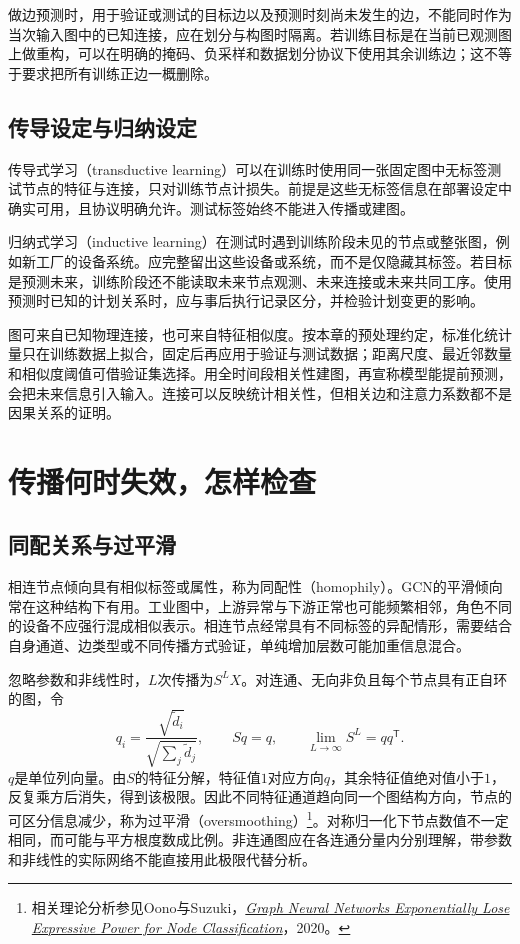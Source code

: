 做边预测时，用于验证或测试的目标边以及预测时刻尚未发生的边，不能同时作为当次输入图中的已知连接，应在划分与构图时隔离。若训练目标是在当前已观测图上做重构，可以在明确的掩码、负采样和数据划分协议下使用其余训练边；这不等于要求把所有训练正边一概删除。

\subsection{传导设定与归纳设定}
传导式学习（transductive learning）可以在训练时使用同一张固定图中无标签测试节点的特征与连接，只对训练节点计损失。前提是这些无标签信息在部署设定中确实可用，且协议明确允许。测试标签始终不能进入传播或建图。

归纳式学习（inductive learning）在测试时遇到训练阶段未见的节点或整张图，例如新工厂的设备系统。应完整留出这些设备或系统，而不是仅隐藏其标签。若目标是预测未来，训练阶段还不能读取未来节点观测、未来连接或未来共同工序。使用预测时已知的计划关系时，应与事后执行记录区分，并检验计划变更的影响。

图可来自已知物理连接，也可来自特征相似度。按本章的预处理约定，标准化统计量只在训练数据上拟合，固定后再应用于验证与测试数据；距离尺度、最近邻数量和相似度阈值可借验证集选择。用全时间段相关性建图，再宣称模型能提前预测，会把未来信息引入输入。连接可以反映统计相关性，但相关边和注意力系数都不是因果关系的证明。

\section{传播何时失效，怎样检查}
\subsection{同配关系与过平滑}
相连节点倾向具有相似标签或属性，称为同配性（homophily）。GCN的平滑倾向常在这种结构下有用。工业图中，上游异常与下游正常也可能频繁相邻，角色不同的设备不应强行混成相似表示。相连节点经常具有不同标签的异配情形，需要结合自身通道、边类型或不同传播方式验证，单纯增加层数可能加重信息混合。

忽略参数和非线性时，$L$次传播为$S^LX$。对连通、无向非负且每个节点具有正自环的图，令
\begin{equation}
 q_i=\frac{\sqrt{\widetilde d_i}}{\sqrt{\sum_j\widetilde d_j}},\qquad
 Sq=q,\qquad \lim_{L\to\infty}S^L=qq^{\mathsf T}.
 \label{eq:graph-oversmoothing-limit}
\end{equation}
$q$是单位列向量。由$S$的特征分解，特征值$1$对应方向$q$，其余特征值绝对值小于$1$，反复乘方后消失，得到该极限。因此不同特征通道趋向同一个图结构方向，节点的可区分信息减少，称为过平滑（oversmoothing）\footnote{相关理论分析参见Oono与Suzuki，\href{https://arxiv.org/abs/1905.10947}{\textit{Graph Neural Networks Exponentially Lose Expressive Power for Node Classification}}，2020。}。对称归一化下节点数值不一定相同，而可能与平方根度数成比例。非连通图应在各连通分量内分别理解，带参数和非线性的实际网络不能直接用此极限代替分析。

